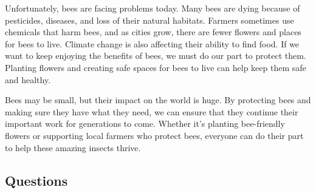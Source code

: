 \documentclass[12pt]{article}
\begin{document}
\begin{tcolorbox}[colframe=black!40, colback=gray!5]
\begin{spacing}{1.15}
    Unfortunately, bees are facing problems today. Many bees are dying because of pesticides, diseases, and loss of their natural habitats. Farmers sometimes use chemicals that harm bees, and as cities grow, there are fewer flowers and places for bees to live. Climate change is also affecting their ability to find food. If we want to keep enjoying the benefits of bees, we must do our part to protect them. Planting flowers and creating safe spaces for bees to live can help keep them safe and healthy.

    Bees may be small, but their impact on the world is huge. By protecting bees and making sure they have what they need, we can ensure that they continue their important work for generations to come. Whether it’s planting bee-friendly flowers or supporting local farmers who protect bees, everyone can do their part to help these amazing insects thrive.
\end{spacing}
\end{tcolorbox}

\vspace{1cm}

\subsection*{Questions}
\end{document}

